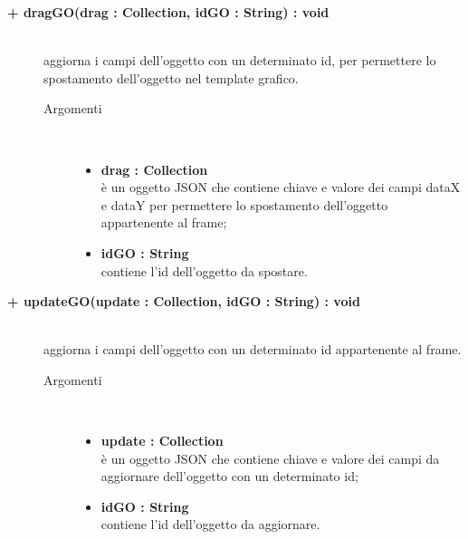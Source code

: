 \begin{description}
\begin{description}
\end{description}

\begin{description}
		\item[\textbf{\color{blue}+ dragGO(drag : Collection, idGO : String) : void			}] \hfill \\
			aggiorna i campi dell'oggetto con un determinato id, per permettere lo spostamento dell'oggetto nel template grafico.    

\begin{description}
			\item[Argomenti] \hfill \\
				\begin{itemize}
					\item \textbf{drag : Collection			} \hfill \\
					è un oggetto JSON che contiene chiave e valore dei campi dataX e dataY per permettere lo spostamento dell'oggetto appartenente al frame;
					\item \textbf{idGO : String			} \hfill \\
					contiene l'id dell'oggetto da spostare.
				\end{itemize}

\end{description}

\end{description}

\begin{description}
		\item[\textbf{\color{blue}+ updateGO(update : Collection, idGO : String) : void			}] \hfill \\
			aggiorna i campi dell'oggetto con un determinato id appartenente al frame.  

\begin{description}
			\item[Argomenti] \hfill \\
				\begin{itemize}
						\item \textbf{update : Collection			} \hfill \\
					è un oggetto JSON che contiene chiave e valore dei campi da aggiornare dell'oggetto con un determinato id;
					\item \textbf{idGO : String			} \hfill \\
					contiene l'id dell'oggetto da aggiornare.
				\end{itemize}

\end{description}

\end{description}


\end{description}

